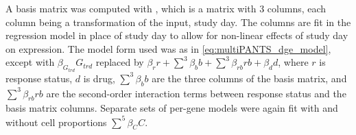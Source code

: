 A basis matrix \autocite{perperoglou2019ReviewSplineFunction} was computed with ,
which is a matrix with 3 columns, each column being a transformation of the input, study day.
The columns are fit in the regression model in place of study day to allow for non-linear effects of study day on expression.
The model form used was as in \cref{eq:multiPANTS_dge_model},
except with $\beta_{G_{trd}} G_{trd}$
replaced by $\beta_r r + \sum_{}^{3}{\beta_b b} + \sum_{}^{3}{\beta_{rb} rb} + \beta_d d$,
where $r$ is response status,
$d$ is drug,
$\sum_{}^{3}{\beta_b b}$ are the three columns of the basis matrix,
and $\sum_{}^{3}{\beta_{rb} rb}$ are the second-order interaction terms between response status and the basis matrix columns.
Separate sets of per-gene models were again fit with and without cell proportions $\sum_{}^{5}{\beta_C C}$.

%

